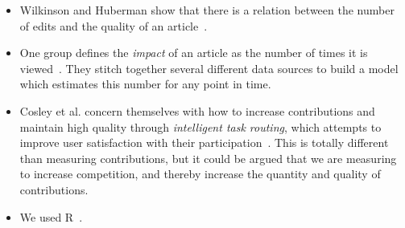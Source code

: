 \begin{itemize}
\item Wilkinson and Huberman show that there is a relation between
	the number of edits and the quality of an article~\cite{EditsEqQuality2007}.

\item One group defines the \textit{impact} of an article as the number
	of times it is viewed~\cite{WikiImpact2007}.  They stitch together
	several different data sources to build a model which estimates this number
	for any point in time.  


\item Cosley et al. concern themselves with how to increase contributions
	and maintain high quality through \textit{intelligent task routing},
	which attempts to improve user satisfaction with their
	participation~\cite{TaskRouting2006}.
	This is totally different than measuring contributions,
	but it could be argued that we are measuring to
	increase competition, and thereby increase the quantity and
	quality of contributions.  

\item We used R~\cite{R2007}.

\end{itemize}
